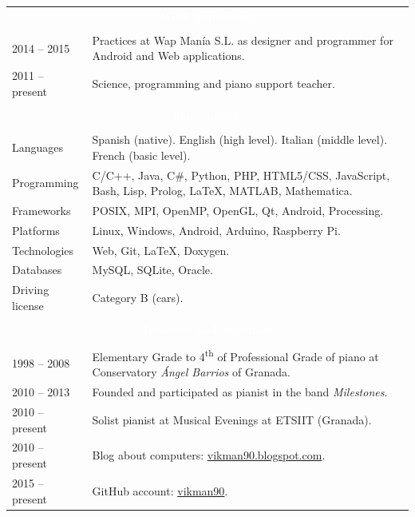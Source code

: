 \documentclass[12pt,a4paper]{article}
\newcommand{\header}[1]{\multicolumn{2}{c}{\cellcolor{black} \textcolor{white} {#1}} \\}
\begin{document}
		\begin{tabular}{p{}p{}}
		\header{\textbf{Work experience}}
		\\
		2014 -- 2015 & Practices at Wap Manía S.L. as designer and programmer 
		for Android and Web applications. \\	
		2011 -- present & Science, programming and piano support teacher. \\
		\\
		\header{\textbf{Skills profile}}
		\\
		Languages & Spanish (native). \newline
		English (high level). \newline
		Italian (middle level). \newline
		French (basic level). \\
		Programming & C/C++, Java, C\#, Python, PHP, HTML5/CSS, JavaScript, 
		Bash, Lisp, Prolog, LaTeX, MATLAB, Mathematica. \\
		Frameworks & POSIX, MPI, OpenMP, OpenGL, Qt, Android, Processing. \\
		Platforms & Linux, Windows, Android, Arduino, Raspberry Pi. \\
		Technologies & Web, Git, LaTeX, Doxygen. \\
		Databases & MySQL, SQLite, Oracle. \\
		Driving license & Category B (cars). \\
		\\
		\header{\textbf{Interests and activities}}
		\\
		1998 -- 2008 & Elementary Grade to 4\textsuperscript{th} of Professional
		Grade of piano at Conservatory \textit{Ángel Barrios} of Granada. \\
		2010 -- 2013 & Founded and participated as pianist in the band 
		\textit{Milestones}. \\
		2010 -- present & Solist pianist at Musical Evenings at ETSIIT (Granada). \\
		2010 -- present & Blog about computers: 
		\href{http://vikman90.blogspot.com}{vikman90.blogspot.com}. \\
		2015 -- present & GitHub account: 
		\href{https://github.com/vikman90}{vikman90}. \\
	\end{tabular}
\end{document}
